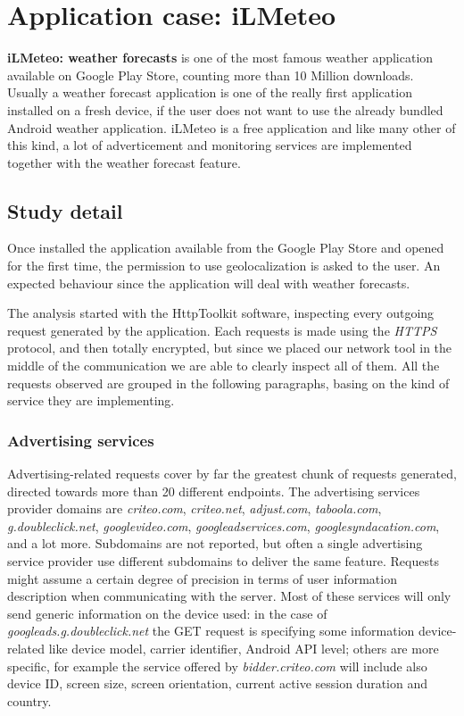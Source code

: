 \section{Application case: iLMeteo}
		\par \textbf{iLMeteo: weather forecasts} is one of the most famous weather application available on Google Play Store, counting more than 10 Million downloads. Usually a weather forecast application is one of the really first application installed on a fresh device, if the user does not want to use the already bundled Android weather application. iLMeteo is a free application and like many other of this kind, a lot of adverticement and monitoring services are implemented together with the weather forecast feature. 
		
		\subsection{Study detail}
			\par Once installed the application available from the Google Play Store and opened for the first time, the permission to use geolocalization is asked to the user. An expected behaviour since the application will deal with weather forecasts. \newline
			\par The analysis started with the HttpToolkit software, inspecting every outgoing request generated by the application. Each requests is made using the \textit{HTTPS} protocol, and then totally encrypted, but since we placed our network tool in the middle of the communication we are able to clearly inspect all of them. All the requests observed are grouped in the following paragraphs, basing on the kind of service they are implementing.
			
			\subsubsection{Advertising services}
				\par Advertising-related requests cover by far the greatest chunk of requests generated, directed towards more than 20 different endpoints. The advertising services provider domains are \textit{criteo.com}, \textit{criteo.net}, \textit{adjust.com}, \textit{taboola.com}, \textit{g.doubleclick.net}, \textit{googlevideo.com}, \textit{googleadservices.com}, \textit{googlesyndacation.com}, and a lot more. Subdomains are not reported, but often a single advertising service provider use different subdomains to deliver the same feature.\newline
				Requests might assume a certain degree of precision in terms of user information description when communicating with the server. Most of these services will only send generic information on the device used: in the case of  \textit{googleads.g.doubleclick.net} the GET request is specifying some information device-related like device model, carrier identifier, Android API level; others are more specific, for example the service offered by \textit{bidder.criteo.com} will include also device ID, screen size, screen orientation, current active session duration and country.
				
